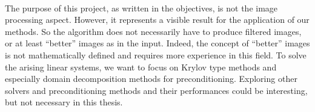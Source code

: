 \paragraph{}
The purpose of this project, as written in the objectives, is not the image processing aspect.
However, it represents a visible result for the application of our methods.
So the algorithm does not necessarily have to produce filtered images, or at least ``better'' images as in the input.
Indeed, the concept of ``better'' images is not mathematically defined and requires more experience in this field.
To solve the arising linear systems, we want to focus on Krylov type methods and especially domain decomposition methods for preconditioning.
Exploring other solvers and preconditioning methods and their performances could be interesting, but not necessary in this thesis.
